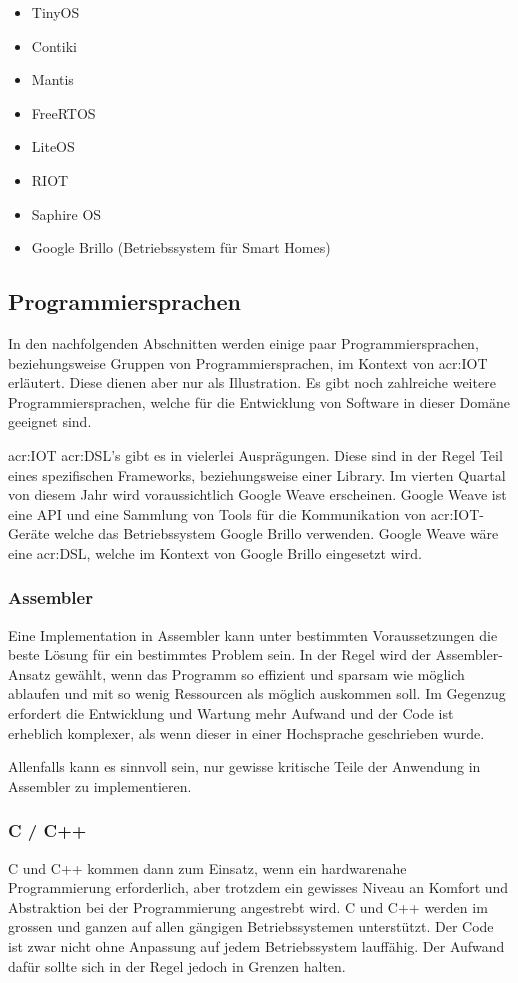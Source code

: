 \begin{itemize}
\item TinyOS
\item Contiki
\item Mantis
\item FreeRTOS
\item LiteOS
\item RIOT
\item Saphire OS
\item Google Brillo (Betriebssystem für Smart Homes)
\end{itemize}



\subsection{Programmiersprachen}
In den nachfolgenden Abschnitten werden einige paar Programmiersprachen, beziehungsweise Gruppen von Programmiersprachen, im Kontext von \gls{acr:IOT} erläutert. Diese dienen aber nur als Illustration. Es gibt noch zahlreiche weitere Programmiersprachen, welche für die Entwicklung von Software in dieser Domäne geeignet sind.

\gls{acr:IOT} \gls{acr:DSL}'s gibt es in vielerlei Ausprägungen. Diese sind in der Regel Teil eines spezifischen Frameworks, beziehungsweise einer Library. Im vierten Quartal von diesem Jahr wird voraussichtlich Google Weave erscheinen. Google Weave ist eine API und eine Sammlung von Tools für die Kommunikation von \gls{acr:IOT}-Geräte welche das Betriebssystem Google Brillo verwenden. Google Weave wäre eine \gls{acr:DSL}, welche im Kontext von Google Brillo eingesetzt wird.

\subsubsection{Assembler}
Eine Implementation in Assembler kann unter bestimmten Voraussetzungen die beste Lösung für ein bestimmtes Problem sein. In der Regel wird der Assembler-Ansatz gewählt, wenn das Programm so effizient und sparsam wie möglich ablaufen und mit so wenig Ressourcen als möglich auskommen soll. Im Gegenzug erfordert die Entwicklung und Wartung mehr Aufwand und der Code ist erheblich komplexer, als wenn dieser in einer Hochsprache geschrieben wurde.

Allenfalls kann es sinnvoll sein, nur gewisse kritische Teile der Anwendung in Assembler zu implementieren.


\subsubsection{C / C++}
C und C++ kommen dann zum Einsatz, wenn ein hardwarenahe Programmierung erforderlich, aber trotzdem ein gewisses Niveau an Komfort und Abstraktion bei der Programmierung angestrebt wird. C und C++ werden im grossen und ganzen auf allen gängigen Betriebssystemen unterstützt. Der Code ist zwar nicht ohne Anpassung auf jedem Betriebssystem lauffähig. Der Aufwand dafür sollte sich in der Regel jedoch in Grenzen halten.


